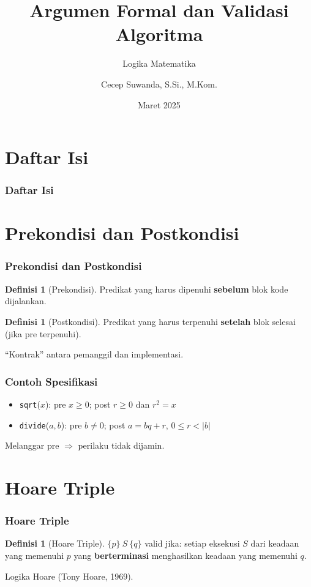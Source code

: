 \documentclass[handout]{beamer}
\subtitle[Logika Matematika]{Logika Matematika}
\title[Validasi Algoritma]{Argumen Formal dan Validasi Algoritma}
\author{Cecep Suwanda, S.Si., M.Kom.}
\date{Maret 2025}
\institute{Universitas Bale Bandung}
\theoremstyle{definition}
\newtheorem{definisi}[theorem]{Definisi}
\theoremstyle{example}
\begin{document}
\maketitle

\section*{Daftar Isi}
\begin{frame}
\frametitle{Daftar Isi}
\tableofcontents
\end{frame}

\section{Prekondisi dan Postkondisi}

\begin{frame}
\frametitle{Prekondisi dan Postkondisi}
\begin{definisi}[Prekondisi]
Predikat yang harus dipenuhi \textbf{sebelum} blok kode dijalankan.
\end{definisi}
\begin{definisi}[Postkondisi]
Predikat yang harus terpenuhi \textbf{setelah} blok selesai (jika pre terpenuhi).
\end{definisi}
``Kontrak'' antara pemanggil dan implementasi.
\end{frame}

\begin{frame}
\frametitle{Contoh Spesifikasi}
\begin{itemize}
  \item \texttt{sqrt}($x$): pre $x \geq 0$; post $r \geq 0$ dan $r^2 = x$
  \item \texttt{divide}($a,b$): pre $b \neq 0$; post $a = bq + r$, $0 \leq r < |b|$
\end{itemize}
Melanggar pre $\Rightarrow$ perilaku tidak dijamin.
\end{frame}

\section{Hoare Triple}

\begin{frame}
\frametitle{Hoare Triple}
\begin{definisi}[Hoare Triple]
$\{p\}\ S\ \{q\}$ valid jika: setiap eksekusi $S$ dari keadaan yang memenuhi $p$ yang \textbf{berterminasi} menghasilkan keadaan yang memenuhi $q$.
\end{definisi}
Logika Hoare (Tony Hoare, 1969).
\end{frame}
\end{document}
